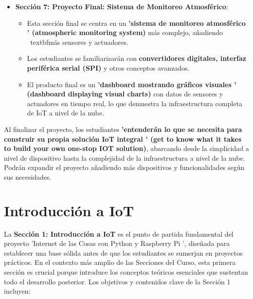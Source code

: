 \documentclass{report}
\begin{document}
\begin{itemize}
    \item \textbf{Sección 7: Proyecto Final: Sistema de Monitoreo Atmosférico}:
    \begin{itemize}
        \item Esta sección final se centra en un \textbf{ 'sistema de monitoreo atmosférico ' (atmospheric monitoring system)} más complejo, añadiendo \
        textbf{más sensores y actuadores}.
        \item Los estudiantes se familiarizarán con \textbf{convertidores digitales, interfaz periférica serial (SPI)} y otros conceptos avanzados.
        \item El producto final es un \textbf{ 'dashboard mostrando gráficos visuales ' (dashboard displaying visual charts)} con datos de sensores y 
        actuadores en tiempo real, lo que demuestra la infraestructura completa de IoT a nivel de la nube.
    \end{itemize}
\end{itemize}
Al finalizar el proyecto, los estudiantes \textbf{ 'entenderán lo que se necesita para construir su propia solución IoT integral ' (get to know what it 
takes to build your own one-stop IOT solution)}, abarcando desde la simplicidad a nivel de dispositivo hasta la complejidad de la infraestructura a nivel 
de la nube. Podrán expandir el proyecto añadiendo más dispositivos y funcionalidades según sus necesidades.

\section{Introducción a IoT}
La \textbf{Sección 1: Introducción a IoT} es el punto de partida fundamental del proyecto  'Internet de las Cosas con Python y Raspberry Pi ', diseñada 
para establecer una base sólida antes de que los estudiantes se sumerjan en proyectos prácticos. En el contexto más amplio de las Secciones del Curso, 
esta primera sección es crucial porque introduce los conceptos teóricos esenciales que sustentan todo el desarrollo posterior. 
Los objetivos y contenidos clave de la Sección 1 incluyen:
\end{document}
